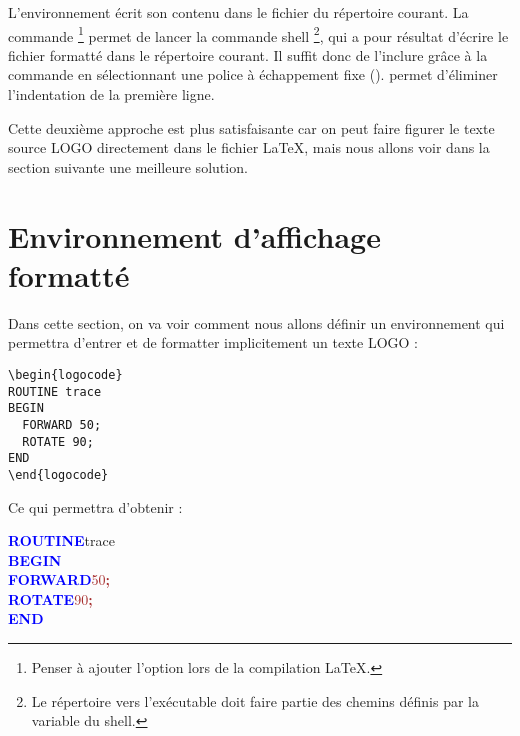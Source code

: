 L'environnement  écrit son contenu dans le fichier  du répertoire courant. La commande \footnote{Penser à ajouter l'option  lors de la compilation \LaTeX.} permet de lancer la commande shell \footnote{Le répertoire vers l'exécutable  doit faire partie des chemins définis par la variable  du shell.}, qui a pour résultat d'écrire le fichier formatté  dans le répertoire courant. Il suffit donc de l'inclure grâce à la commande  en sélectionnant une police à échappement fixe ().  permet d'éliminer l'indentation de la première ligne.

Cette deuxième approche est plus satisfaisante car on peut faire figurer le texte source LOGO directement dans le fichier \LaTeX, mais nous allons voir dans la section suivante une meilleure solution.











\section{Environnement d'affichage formatté}

Dans cette section, on va voir comment nous allons définir un environnement  qui permettra d'entrer et de formatter implicitement un texte LOGO :

\begin{verbatim}
\begin{logocode}
ROUTINE trace
BEGIN
  FORWARD 50;
  ROTATE 90;
END
\end{logocode}
\end{verbatim}

Ce qui permettra d'obtenir :

{\noindent\ttfamily
\textcolor{blue}{\bf ROUTINE}\hspace*{.6em}t{}r{}a{}c{}e{} \\
\textcolor{blue}{\bf BEGIN} \\
\hspace*{1.2em}\textcolor{blue}{\bf FORWARD}\hspace*{.6em}\textcolor{brown}{5{}0{}}\textcolor{brown}{\bf ;} \\
\hspace*{1.2em}\textcolor{blue}{\bf ROTATE}\hspace*{.6em}\textcolor{brown}{9{}0{}}\textcolor{brown}{\bf ;} \\
\textcolor{blue}{\bf END}
}


